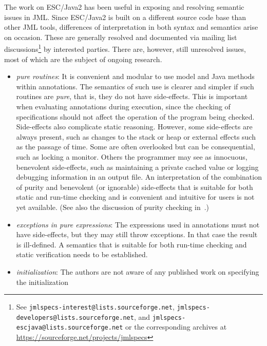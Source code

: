 \documentclass{sig-alternate}
\begin{document}
The work on ESC/Java2 has been useful in exposing and resolving
semantic issues in JML.  Since ESC/Java2 is built on a different
source code base than other JML tools, differences of interpretation
in both syntax and semantics arise on occasion.  These are generally
resolved and documented via mailing list discussions\footnote{See \texttt{jmlspecs-interest@lists.sourceforge.net}, 
\texttt{jmlspecs-developers@lists.sourceforge.net}, and
\texttt{jmlspecs-escjava@lists.sourceforge.net} or the corresponding archives at \url{https://sourceforge.net/projects/jmlspecs}}
by interested
parties.  There are, however, still unresolved issues, most of which
are the subject of ongoing research.
\setlength{\partopsep}{0in}\setlength{\parskip}{0in}\setlength{\itemsep}{0in}\setlength{\topsep}{0in}
\begin{itemize}
\setlength{\partopsep}{0in}\setlength{\parskip}{0in}\setlength{\itemsep}{0in}\setlength{\topsep}{0in}
\item \textit{pure routines}:  It is convenient and modular to use model and Java methods within
annotations.  The semantics of such use is clearer and simpler if such routines are {\em pure}, that is, they do not have side-effects.  This is important when evaluating annotations during
execution, since the checking of specifications should not affect the operation of the program being
checked.  Side-effects also complicate static reasoning.   However, some side-effects are
always present, such as changes to the stack or heap or external effects such as the passage of time.  Some are often overlooked but can be consequential, such as locking a monitor. 
 Others the programmer may
see as innocuous, benevolent side-effects, such as maintaining a private cached value or logging debugging information in an output file.
An interpretation of the combination of purity and benevolent (or ignorable)
  side-effects that is suitable for both static and run-time checking and is convenient and intuitive
for users is not yet available. (See also the discussion of purity checking in~\cite{Leavens-etal03a}.)
\item \textit{exceptions in pure expressions}:  The expressions used in annotations must not have
side-effects, but they may still throw exceptions.  In that case the result is ill-defined.  A
semantics that is suitable for both run-time checking and static verification needs to be 
established.
\item \textit{initialization}:  The authors are not aware of any published work on specifying the initialization

\end{itemize}
\end{document}
